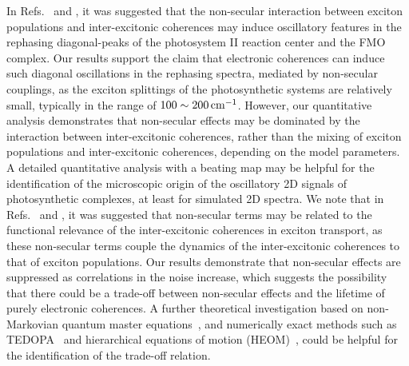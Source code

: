 \documentclass[%
 reprint,%
 amssymb, amsmath,%
 aip,cha,%
]{revtex4-1}
\begin{document}
In Refs.~ and , it was suggested that the non-secular interaction between exciton populations and inter-excitonic coherences may induce oscillatory features in the rephasing diagonal-peaks of the photosystem II reaction center and the FMO complex. Our results support the claim that electronic coherences can induce such diagonal oscillations in the rephasing spectra, mediated by non-secular couplings, as the exciton splittings of the photosynthetic systems are relatively small, typically in the range of $100\sim200\,{\rm cm}^{-1}$\cite{AbramaviciusJCP2010,PanitchayangkoonPNAS2011}. However, our quantitative analysis demonstrates that non-secular effects may be dominated by the interaction between inter-excitonic coherences, rather than the mixing of exciton populations and inter-excitonic coherences, depending on the model parameters. A detailed quantitative analysis with a beating map may be helpful for the identification of the microscopic origin of the oscillatory 2D signals of photosynthetic complexes, at least for simulated 2D spectra. We note that in Refs.~ and , it was suggested that non-secular terms may be related to the functional relevance of the inter-excitonic coherences in exciton transport, as these non-secular terms couple the dynamics of the inter-excitonic coherences to that of exciton populations. Our results demonstrate that non-secular effects are suppressed as correlations in the noise increase, which suggests the possibility that there could be a trade-off between non-secular effects and the lifetime of purely electronic coherences. A further theoretical investigation based on non-Markovian quantum master equations~\cite{Roden2011,Iles-Smith2016}, and numerically exact methods such as TEDOPA~\cite{PriorPRL2010,ChinNP2013} and hierarchical equations of motion (HEOM)~\cite{TanimuraJPSJ2006,StrumpferJCP2011,MascherpaarXiv2016}, could be helpful for the identification of the trade-off relation.
\end{document}
